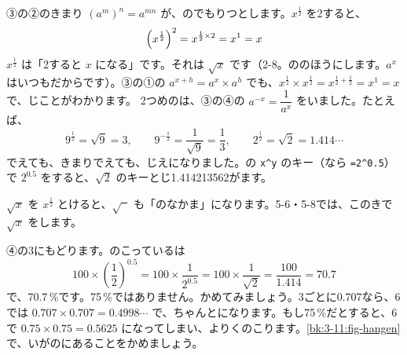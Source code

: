 ③の②のきまり $(a^m)^n=a^{mn}$ が、のでもりつとします。$x^{\frac{1}{2}}$ を2すると、
\[ \Bigl(x^{\frac{1}{2}}\Bigr)^2=x^{\frac{1}{2}\times2}=x^1=x \]
$x^{\frac{1}{2}}$ は「2すると $x$ になる」です。それは $\sqrt{x}$ です（2-8。ののほうにします。$a^x$ はいつもだからです）。③の①の $a^{x+h}=a^x\times a^h$ でも、$x^{\frac{1}{2}}\times x^{\frac{1}{2}}=x^{\frac{1}{2}+\frac{1}{2}}=x^1=x$ で、じことがわかります。
2つめのは、③の④の $a^{-x}=\dfrac{1}{a^x}$ をいました。たとえば、
\[ 9^{\frac{1}{2}}=\sqrt{9}=3,\qquad 9^{-\frac{1}{2}}=\frac{1}{\sqrt{9}}=\frac{1}{3},\qquad 2^{\frac{1}{2}}=\sqrt{2}=1.414\cdots \]
でえても、きまりでえても、じえになりました。の \texttt{x\^{}y} のキー（なら \texttt{=2\^{}0.5}）で $2^{0.5}$ をすると、$\sqrt{2}$ のキーとじ1.414213562がます。

\noindent\begin{minipage}[t]{0.42\linewidth}\vspace{0pt}
$\sqrt{x}$ を $x^{\frac{1}{2}}$ とけると、$\sqrt{\phantom{x}}$ も「のなかま」になります。5-6・5-8では、このきで $\sqrt{x}$ をします。
\end{minipage}\hfill
\begin{minipage}[t]{67mm}\vspace{0pt}\end{minipage}
\par\vspace{6pt}

④の3にもどります。のこっているは
\[ 100\times\left(\frac{1}{2}\right)^{0.5}=100\times\frac{1}{2^{0.5}}=100\times\frac{1}{\sqrt{2}}=\frac{100}{1.414}=70.7 \]
で、70.7\,\%です。75\,\%ではありません。かめてみましょう。3ごとに0.707なら、6では $0.707\times0.707=0.4998\cdots$ で、ちゃんとになります。もし75\,\%だとすると、6で $0.75\times0.75=0.5625$ になってしまい、よりくのこります。\ref{bk:3-11:fig-hangen}で、いがのにあることをかめましょう。

